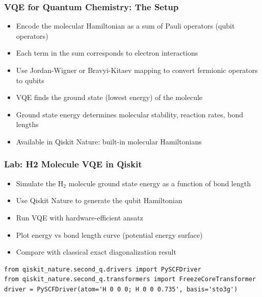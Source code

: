 \begin{frame}[fragile]\frametitle{VQE for Quantum Chemistry: The Setup}
\begin{itemize}
\item Encode the molecular Hamiltonian as a sum of Pauli operators (qubit operators)
\item Each term in the sum corresponds to electron interactions
\item Use Jordan-Wigner or Bravyi-Kitaev mapping to convert fermionic operators to qubits
\item VQE finds the ground state (lowest energy) of the molecule
\item Ground state energy determines molecular stability, reaction rates, bond lengths
\item Available in Qiskit Nature: built-in molecular Hamiltonians
\end{itemize}
\end{frame}

\begin{frame}[fragile]\frametitle{Lab: H2 Molecule VQE in Qiskit}
\begin{itemize}
\item Simulate the H$_2$ molecule ground state energy as a function of bond length
\item Use Qiskit Nature to generate the qubit Hamiltonian
\item Run VQE with hardware-efficient ansatz
\item Plot energy vs bond length curve (potential energy surface)
\item Compare with classical exact diagonalization result
\end{itemize}
\begin{verbatim}
from qiskit_nature.second_q.drivers import PySCFDriver
from qiskit_nature.second_q.transformers import FreezeCoreTransformer
driver = PySCFDriver(atom='H 0 0 0; H 0 0 0.735', basis='sto3g')
\end{verbatim}
\end{frame}

